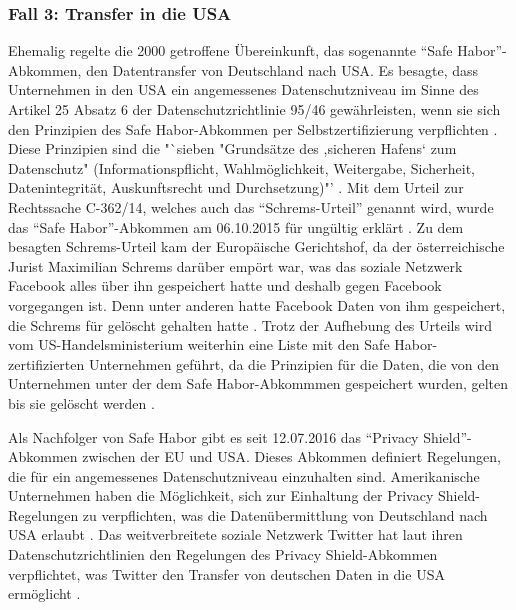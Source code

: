 \subsubsection{Fall 3: Transfer in die USA}
Ehemalig regelte die 2000 getroffene Übereinkunft, das sogenannte "`Safe Habor"'-Abkommen, den Datentransfer von Deutschland nach USA. Es besagte, dass Unternehmen in den USA ein angemessenes Datenschutzniveau im Sinne des Artikel 25 Absatz 6 der Datenschutzrichtlinie 95/46 gewährleisten, wenn sie sich den Prinzipien des Safe Habor-Abkommen per Selbstzertifizierung verpflichten \autocite[vgl.][]{BDFI.2017}. Diese Prinzipien sind die "`sieben "Grundsätze des ,sicheren Hafens‘ zum Datenschutz"  (Informationspflicht, Wahlmöglichkeit, Weitergabe, Sicherheit, Datenintegrität, Auskunftsrecht und Durchsetzung)"' \autocite[][]{BDFI.2017}. Mit dem Urteil zur Rechtssache C-362/14, welches auch das "`Schrems-Urteil"' genannt wird, wurde das "`Safe Habor"'-Abkommen am 06.10.2015 für ungültig erklärt \autocite[vgl.][]{BDFI.2017}. Zu dem besagten Schrems-Urteil kam der Europäische Gerichtshof, da der österreichische Jurist Maximilian Schrems darüber empört war, was das soziale Netzwerk Facebook alles über ihn gespeichert hatte und deshalb gegen Facebook vorgegangen ist. Denn unter anderen hatte Facebook Daten von ihm gespeichert, die Schrems für gelöscht gehalten hatte \autocite[vgl.][]{Welt.2015}. Trotz der Aufhebung des Urteils wird vom US-Handelsministerium weiterhin eine Liste mit den Safe Habor-zertifizierten Unternehmen geführt, da die Prinzipien für die Daten, die von den Unternehmen unter der dem Safe Habor-Abkommmen gespeichert wurden, gelten bis sie gelöscht werden \autocite[vgl.][]{BDFI.2017}.
\par
Als Nachfolger von Safe Habor gibt es seit 12.07.2016 das "`Privacy Shield"'-Abkommen zwischen der \ac{EU} und USA. Dieses Abkommen definiert Regelungen, die für ein angemessenes Datenschutzniveau einzuhalten sind. Amerikanische Unternehmen haben die Möglichkeit, sich zur Einhaltung der Privacy Shield-Regelungen zu verpflichten, was die Datenübermittlung von Deutschland nach USA erlaubt \autocite[vgl.][]{LDI.2017}. Das weitverbreitete soziale Netzwerk Twitter hat laut ihren Datenschutzrichtlinien den Regelungen des Privacy Shield-Abkommen verpflichtet, was Twitter den Transfer von deutschen Daten in die USA ermöglicht \autocite[vgl.][]{TwitterInc..2017}.


